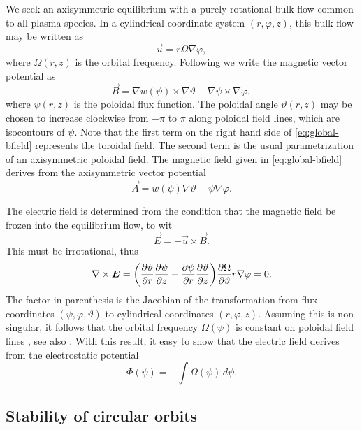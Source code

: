 \documentclass[aps,pre,notitlepage,amsmath,amssymb,amsfonts,nobibnotes,nofootinbib,superscriptaddress]{revtex4-1}
\begin{document}
We seek an axisymmetric equilibrium with a purely rotational bulk flow common
to all plasma species. In a cylindrical coordinate system $(r,\varphi,z)$,
this bulk flow may be written as
\begin{equation}
  \vec{u} = r\Omega\nabla\varphi,
\end{equation}
where $\Omega(r,z)$ is the orbital frequency. Following
\citet{Kaufman1972,Cary1983} we write the magnetic vector potential as
\begin{equation}
  \label{eq:global-bfield}
  \vec{B} =
  \nabla w(\psi)\times\nabla\vartheta - \nabla\psi\times\nabla\varphi,
\end{equation}
where $\psi(r,z)$ is the poloidal flux function. The poloidal angle
$\vartheta(r,z)$ may be chosen to increase clockwise from $-\pi$ to $\pi$
along poloidal field lines, which are isocontours of $\psi$. Note that the
first term on the right hand side of \cref{eq:global-bfield} represents the
toroidal field. The second term is the usual parametrization of an
axisymmetric poloidal field. The magnetic field given in
\cref{eq:global-bfield} derives from the axisymmetric vector potential
\begin{equation}
  \vec{A} = w(\psi)\nabla\vartheta - \psi\nabla\varphi.
\end{equation}

The electric field is determined from the condition that the magnetic field be
frozen into the equilibrium flow, to wit
\begin{equation}
  \vec{E} = -\vec{u}\times\vec{B}.
\end{equation}
This must be irrotational, thus
\begin{equation}
  \nabla\times\vec{E} =
  \left(
    \pder{\vartheta}{r}\pder{\psi}{z} -
    \pder{\psi}{r}\pder{\vartheta}{z}
  \right)
  \pder{\Omega}{\vartheta}r\nabla\varphi = 0.
\end{equation}
The factor in parenthesis is the Jacobian of the transformation from flux
coordinates $(\psi,\varphi,\vartheta)$ to cylindrical coordinates
$(r,\varphi,z)$. Assuming this is non-singular, it follows that the orbital
frequency $\Omega(\psi)$ is constant on poloidal field lines
\citep{Ferraro1937}, see also \citet{Papaloizou1992}. With this result, it
easy to show that the electric field derives from the electrostatic potential
\begin{equation}
  \Phi(\psi) = -\int\!\Omega(\psi)\,d\psi.
\end{equation}

\subsection{Stability of circular orbits}
\end{document}
